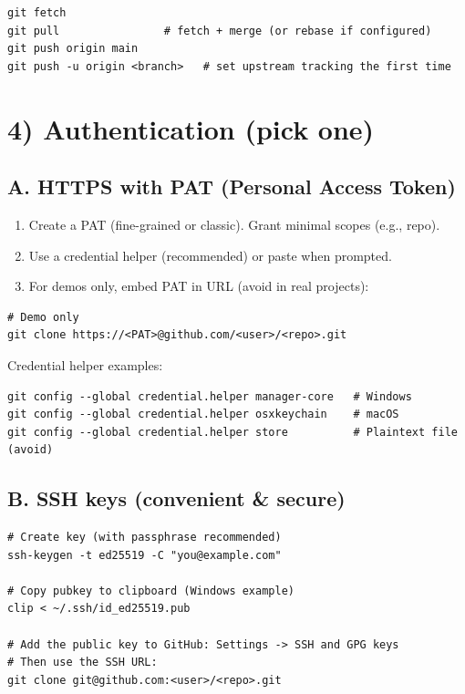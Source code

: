 \documentclass[11pt]{article}
\begin{document}
\begin{verbatim}
git fetch
git pull                # fetch + merge (or rebase if configured)
git push origin main
git push -u origin <branch>   # set upstream tracking the first time
\end{verbatim}

\section*{4) Authentication (pick one)}

\subsection*{A. HTTPS with PAT (Personal Access Token)}
\begin{enumerate}
  \item Create a PAT (fine-grained or classic). Grant minimal scopes (e.g., repo).
  \item Use a credential helper (recommended) or paste when prompted.
  \item For demos only, embed PAT in URL (avoid in real projects):
\end{enumerate}

\begin{verbatim}
# Demo only
git clone https://<PAT>@github.com/<user>/<repo>.git
\end{verbatim}

\noindent Credential helper examples:
\begin{verbatim}
git config --global credential.helper manager-core   # Windows
git config --global credential.helper osxkeychain    # macOS
git config --global credential.helper store          # Plaintext file (avoid)
\end{verbatim}

\subsection*{B. SSH keys (convenient \& secure)}
\begin{verbatim}
# Create key (with passphrase recommended)
ssh-keygen -t ed25519 -C "you@example.com"

# Copy pubkey to clipboard (Windows example)
clip < ~/.ssh/id_ed25519.pub

# Add the public key to GitHub: Settings -> SSH and GPG keys
# Then use the SSH URL:
git clone git@github.com:<user>/<repo>.git
\end{verbatim}
\end{document}
